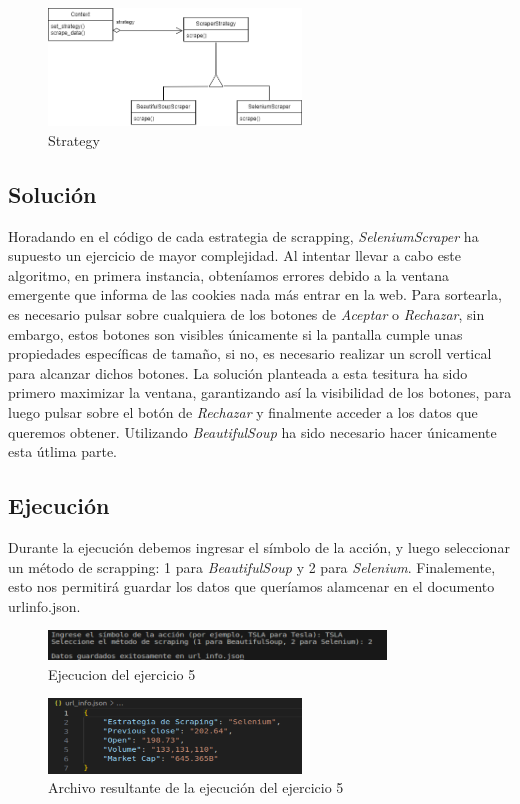 \documentclass{article}
\begin{document}
\begin{figure}[h]
	\centering
        \vspace{15pt}
	\includegraphics[width=0.6\textwidth]{DS_ej5.drawio.png}
	\caption{Strategy}
	\label{fig:strategy}
\end{figure}


\subsection{Solución}
Horadando en el código de cada estrategia de scrapping, \textit{SeleniumScraper} ha supuesto un ejercicio de mayor complejidad. Al intentar llevar a cabo este algoritmo, en primera instancia, obteníamos
errores debido a la ventana emergente que informa de las cookies nada más entrar en la web. Para sortearla, es necesario pulsar sobre cualquiera de
los botones de \textit{Aceptar} o \textit{Rechazar}, sin embargo, estos botones son visibles únicamente si la pantalla cumple unas propiedades 
específicas de tamaño, si no, es necesario realizar un scroll vertical para alcanzar dichos botones. La solución planteada a esta tesitura ha sido 
primero maximizar la ventana, garantizando así la visibilidad de los botones, para luego pulsar sobre el botón de \textit{Rechazar} y finalmente 
acceder a los datos que queremos obtener. Utilizando \textit{BeautifulSoup} ha sido necesario hacer únicamente esta útlima parte.


\subsection{Ejecución}
Durante la ejecución debemos ingresar el símbolo de la acción, y luego seleccionar un método de scrapping: 1 para \textit{BeautifulSoup} y 
2 para \textit{Selenium}. Finalemente, esto nos permitirá guardar los datos que queríamos alamcenar en el documento url\textunderscore{}info.json.

\begin{figure}[h]
	\centering
        \vspace{15pt}
	\includegraphics[width=0.8\textwidth]{DS_ejecucion_ej5-1.png}
	\caption{Ejecucion del ejercicio 5}
	\label{fig:ej5}
\end{figure}

\newpage
\begin{figure}[h]
	\centering
        \vspace{15pt}
        \includegraphics[width=0.6\textwidth]{DS_ejecucion_ej5-2.png}
	\caption{Archivo resultante de la ejecución del ejercicio 5}
	\label{fig:archivo_ej5}
\end{figure}
\end{document}
